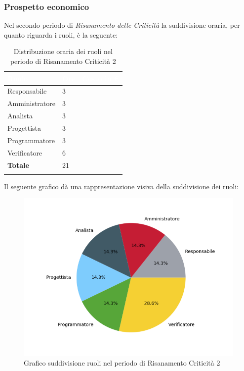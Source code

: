 \subsubsection{Prospetto economico}
Nel secondo periodo di \textit{Risanamento delle Criticità} la suddivisione oraria, per quanto riguarda i ruoli, è la seguente: 


\begin{longtable}{| C{.30\textwidth}| C{.15\textwidth}| C{.20\textwidth}|}
\hline
{}\textbf{\textcolor{white}{Ruolo}} & \textbf{\textcolor{white}{Ore}} & \textbf{\textcolor{white}{Costo in \euro}} \\
\hline 
Responsabile & 3 &  \\
\hline
{}Amministratore & 3 &  \\
\hline
Analista & 3 &  \\
\hline
{}Progettista & 3 & \\
\hline
Programmatore & 3 &  \\
\hline 
{}Verificatore & 6 &  \\
\hline
\textbf{Totale} & 21 &  \\
\hline 

\caption{Distribuzione oraria dei ruoli nel periodo di Risanamento Criticità 2}
\label{Distribuzione oraria per ruoli rc2}
\end{longtable}

Il seguente grafico dà una rappresentazione visiva della suddivisione dei ruoli:
\begin{figure}[H]
	\centering
  		\includegraphics[width=1\linewidth]{./images/torta_rc2.png}
  		\caption{Grafico suddivisione ruoli nel periodo di Risanamento Criticità 2}
  		\label{fig:grafico suddivione ruoli rc2}
\end{figure}

